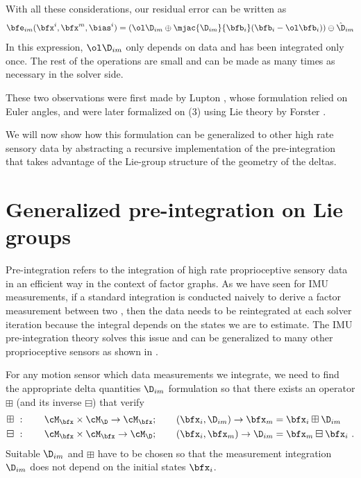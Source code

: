 With all these considerations, our residual error can be written as
%
\begin{align}
    \bfe_{im}(\bfx^i, \bfx^m, \bias^i) = (\ol\D_{im} \oplus \mjac{\D_{im}}{\bfb_i}(\bfb_i-\ol\bfb_i) ) \ominus \hat\D_{im}
    \label{eq:preint_residual}
\end{align}
%
In this expression, $\ol\D_{im}$ only depends on data and has been integrated only once. The rest of the operations are small and can be made as many times as necessary in the solver side.

These two observations were first made by Lupton \cite{lupton-09}, whose formulation relied on Euler angles, and were later formalized on \SO(3) using Lie theory
by Forster \cite{forster2017-TRO}. 


We will now show how this formulation can be generalized to other high rate sensory data by abstracting a recursive implementation of the pre-integration that takes advantage of the Lie-group structure of the geometry of the deltas.



\section{Generalized pre-integration on Lie groups}
\label{sec:general-preint}


Pre-integration refers to the integration of high rate proprioceptive sensory data in an efficient way in the context of factor graphs. 
As we have seen for IMU measurements, if a standard integration is conducted naively to derive a factor measurement between two \keyframes, 
then the data needs to be reintegrated at each solver iteration because the integral depends on the states we are to estimate. 
The IMU pre-integration theory solves this issue and can be generalized to many other proprioceptive sensors as shown in \cite{atchuthan-18-thesis,deray-19-selfcalib,fourmy2021contact}. 

For any motion sensor which data measurements we integrate, we need to find the appropriate delta quantities $\D_{im}$ formulation so that there exists an operator $\boxplus$ (and its inverse $\boxminus$) that verify
%
\begin{align}
    \boxplus~&: \quad\quad \cM_{\bfx} \times \cM_{\D} \rightarrow \cM_{\bfx}; 
    \quad\quad (\bfx_i,\D_{im}) \rightarrow \bfx_m=\bfx_i\boxplus \D_{im} \label{equ:boxplus}\\
    \boxminus~&: \quad\quad \cM_{\bfx} \times \cM_{\bfx} \rightarrow \cM_{\D}; 
    \quad\quad (\bfx_i,\bfx_m) \rightarrow \D_{im}=\bfx_m\boxminus \bfx_i~.
    \label{equ:boxminus}
\end{align}
%
Suitable $\D_{im}$ and $\boxplus$ have to be chosen so that the measurement integration $\D_{im}$ does not depend on the initial states $\bfx_i$.


